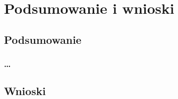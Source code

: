 \chapter{Podsumowanie i wnioski}
\label{t:int}

\section{Podsumowanie}
\label{t:int:stateofart}

	\subsection{\dots}

\section{Wnioski}